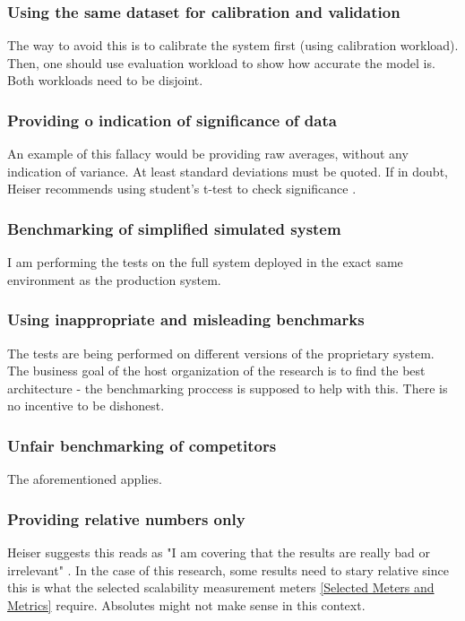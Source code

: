 \documentclass{uvamscse}
\begin{document}
\subsubsection{Using the same dataset for calibration and validation}
The way to avoid this is to calibrate the system first (using calibration workload). Then, one should use evaluation workload to show how accurate the model is. Both workloads need to be disjoint.

\subsubsection{Providing o indication of significance of data}
An example of this fallacy would be providing raw averages, without any indication of variance. At least standard deviations must be quoted. If in doubt, Heiser recommends using student's t-test to check significance \cite{GerHeiBench}.

\subsubsection{Benchmarking of simplified simulated system}
I am performing the tests on the full system deployed in the exact same environment as the production system.

\subsubsection{Using inappropriate and misleading benchmarks}
The tests are being performed on different versions of the proprietary system. The business goal of the host organization of the research is to find the best architecture - the benchmarking proccess is supposed to help with this. There is no incentive to be dishonest.

\subsubsection{Unfair benchmarking of competitors}
The aforementioned applies.

\subsubsection{Providing relative numbers only}
Heiser suggests this reads as "I am covering that the results are really bad or irrelevant" \cite{GerHeiBench}. In the case of this research, some results need to stary relative since this is what the selected scalability measurement meters \ref{Selected Meters and Metrics} require. Absolutes might not make sense in this context.
\end{document}
